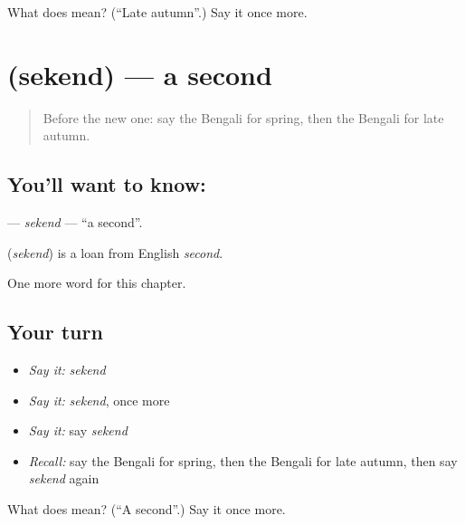 \begin{tcolorbox}[breakable,colback=teal!4,colframe=teal!35!black,title={Before you move on}]
What does  mean? (\textquotedblleft{}Late autumn\textquotedblright{}.) Say it once more.
\end{tcolorbox}
\section[\texorpdfstring{\bn{সেকেন্ড} (sekend)}{সেকেন্ড (sekend)}]{ (sekend) — a second}

\label{lesson:BN-C93-sekend}



\begin{quote}
Before the new one: say the Bengali for spring, then the Bengali for late autumn.
\end{quote}

\subsection*{You'll want to know: }
\textbf{} — \emph{sekend} — \textquotedblleft{}a second\textquotedblright{}.

\begin{cousinweb}
\textbf{} (\emph{sekend}) is a loan from English \emph{second}.
\end{cousinweb}

\begin{grammarlens}[title={What you've built}]
One more word for this chapter.
\end{grammarlens}

\subsection*{Your turn}
\begin{itemize}
\raggedright
  \item \emph{Say it:} \emph{sekend}
  \item \emph{Say it:} \emph{sekend}, once more
  \item \emph{Say it:} say \emph{sekend}
  \item \emph{Recall:} say the Bengali for spring, then the Bengali for late autumn, then say \emph{sekend} again
\end{itemize}

\begin{tcolorbox}[breakable,colback=teal!4,colframe=teal!35!black,title={Before you move on}]
What does  mean? (\textquotedblleft{}A second\textquotedblright{}.) Say it once more.
\end{tcolorbox}
